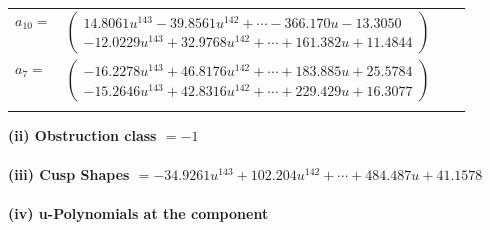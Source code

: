 \documentclass[1p]{elsarticle_modified}
\theoremstyle{definition}
\begin{document}
\begin{tabular}{m{7pt} m{180pt} m{7pt} m{180pt} }
\flushright $a_{10}=$&$\begin{pmatrix}14.8061 u^{143}-39.8561 u^{142}+\cdots-366.170 u-13.3050\\-12.0229 u^{143}+32.9768 u^{142}+\cdots+161.382 u+11.4844\end{pmatrix}$ \\
\flushright $a_{7}=$&$\begin{pmatrix}-16.2278 u^{143}+46.8176 u^{142}+\cdots+183.885 u+25.5784\\-15.2646 u^{143}+42.8316 u^{142}+\cdots+229.429 u+16.3077\end{pmatrix}$\\&\end{tabular}
\flushleft \textbf{(ii) Obstruction class $= -1$}\\~\\
\flushleft \textbf{(iii) Cusp Shapes $= -34.9261 u^{143}+102.204 u^{142}+\cdots+484.487 u+41.1578$}\\~\\
\newpage\renewcommand{\arraystretch}{1}
\flushleft \textbf{(iv) u-Polynomials at the component}\newline \\
\end{document}
